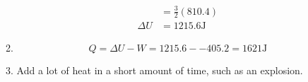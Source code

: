 \documentclass{article}
\begin{document}
\begin{enumerate}
\begin{enumerate}
\begin{align*}
                &= \frac{3}{2} (810.4) \\
                \Delta U &= 1215.6\si{\joule} 
            \end{align*}
        \vspace{0.05in}
        \item
            \begin{equation*}
                Q = \Delta U - W = 1215.6 - -405.2 = 1621\si{\joule}
            \end{equation*}
        \vspace{0.05in}
        \item
            Add a lot of heat in a short amount of time, such as an explosion.
    \end{enumerate}
\end{enumerate}
\end{document}
